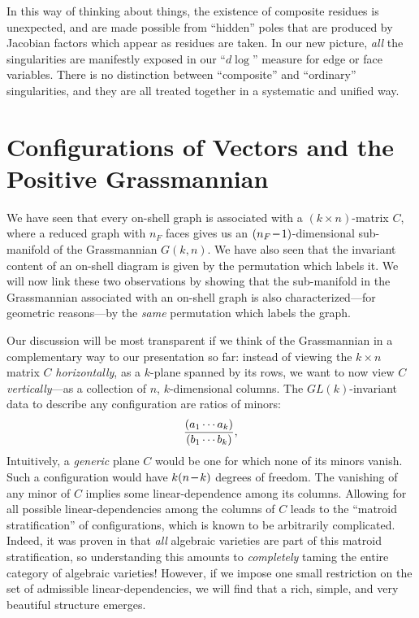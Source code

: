 \documentclass[12pt,hyperref,compress]{JHEP3}
\newcommand{\eq}[1]{\begin{equation}#1\end{equation}}
\newcommand{\mi}{{\rm\rule[2.4pt]{6pt}{0.65pt}}}
\begin{document}
In this way of thinking about things, the existence of composite residues is unexpected, and are made possible from ``hidden'' poles  that are produced by Jacobian factors which appear as residues are taken. In our new picture,
{\it all} the singularities are manifestly exposed in our ``$d\!\log$'' measure for edge or face variables. There is no distinction between ``composite'' and ``ordinary'' singularities, and they are all treated together in a systematic and unified way.







\newpage
\section{Configurations of Vectors and the Positive Grassmannian}\label{configuration_of_vectors_section}

We have seen that every on-shell graph is associated with a $(k\!\times\!n)$-matrix $C$, where a reduced graph with $n_F$ faces gives us an $(n_F\,\mi\,1)$-dimensional sub-manifold of the Grassmannian $G(k,n)$.  We have also seen that the invariant content of an on-shell diagram is given by the permutation which labels it. We will now link these two observations by showing that the sub-manifold in the Grassmannian associated with an on-shell graph is also characterized---for geometric reasons---by the {\it same} permutation which labels the graph.

Our discussion will be most transparent if we think of the Grassmannian in a complementary way to our presentation so far: instead of viewing the $k \times n$ matrix $C$ {\it horizontally}, as a $k$-plane spanned by its rows, we want to now view $C$ {\it vertically}---as a collection of $n$, $k$-dimensional columns.
The $GL(k)$-invariant data to describe any configuration are ratios of minors:
\vspace{-0.25cm}\eq{\frac{(a_1\cdots a_k)}{(b_1\cdots b_k)},\vspace{-0.15cm}}
 Intuitively, a {\it generic} plane $C$ would be one for which none of its minors vanish. Such a configuration would have $k(n\,\mi\,k)$ degrees of freedom. The vanishing of any minor of $C$ implies some linear-dependence among its columns.
Allowing for all possible linear-dependencies among the columns of $C$ leads to the ``matroid stratification'' \cite{GGMS} of configurations, which is known to be arbitrarily complicated.  Indeed, it was proven
in \cite{mnev} that {\it all} algebraic varieties are part of this matroid stratification, so understanding this amounts to {\it completely} taming the entire category of algebraic varieties!
However, if we impose one small restriction on the set of admissible linear-dependencies, we will find that a rich, simple, and very beautiful structure emerges.
\end{document}
